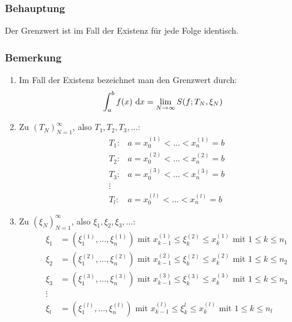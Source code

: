 \subsubsection{Behauptung}
Der Grenzwert ist im Fall der Existenz für jede Folge identisch.

\subsubsection{Bemerkung}
\begin{enumerate}[label= (\alph*)]
    \item Im Fall der Existenz bezeichnet man den Grenzwert durch:
        \begin{equation*}
            \int_{a}^b f(x) \text{ d}x = \lim_{N \rightarrow \infty} S(f; T_N, \xi_N)
        \end{equation*}
    \item Zu ${(T_N)}_{N=1}^\infty$, also $T_1, T_2, T_3, \ldots$:
        \begin{eqnarray*}
            &T_1:& a = x_0^{(1)} < \ldots < x_n^{(1)} = b\\
            &T_2:& a = x_0^{(2)} < \ldots < x_n^{(2)} = b\\
            &T_3:& a = x_0^{(3)} < \ldots < x_n^{(3)} = b\\
            &\vdots&\\
            &T_l:& a = x_0^{(l)} < \ldots < x_n^{(l)} = b
        \end{eqnarray*}
    \item Zu ${(\xi_N)}_{N=1}^\infty$, also $\xi_1, \xi_2, \xi_3, \ldots$:
        \begin{eqnarray*}
            &\xi_1& = (\xi_1^{(1)}, \ldots, \xi_n^{(1)})
            \text{ mit } x_{k-1}^{(1)} \leq \xi_k^{(2)} \leq x_k^{(1)}
            \text{ mit } 1 \leq k \leq n_1\\
            &\xi_2& = (\xi_1^{(2)}, \ldots, \xi_n^{(2)})
            \text{ mit } x_{k-1}^{(2)} \leq \xi_k^{(2)} \leq x_k^{(2)}
            \text{ mit } 1 \leq k \leq n_2\\
            &\xi_3& = (\xi_1^{(3)}, \ldots, \xi_n^{(3)})
            \text{ mit } x_{k-1}^{(3)} \leq \xi_k^{(3)} \leq x_k^{(3)}
            \text{ mit } 1 \leq k \leq n_3\\
            &\vdots&\\
            &\xi_l& = (\xi_1^{(l)}, \ldots, \xi_n^{(l)})
            \text{ mit } x_{k-1}^{(l)} \leq \xi_k^{l} \leq x_k^{(l)}
            \text{ mit } 1 \leq k \leq n_l\\

\end{eqnarray*}
\end{enumerate}
